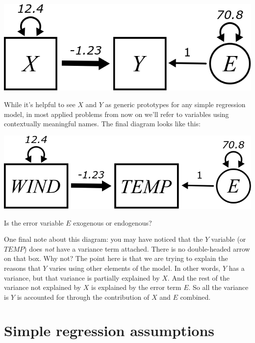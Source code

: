\documentclass[
]{book}
\begin{document}
\begin{center}\includegraphics{graphics/simple_regression_param_values} \end{center}

While it's helpful to see \(X\) and \(Y\) as generic prototypes for any simple regression model, in most applied problems from now on we'll refer to variables using contextually meaningful names. The final diagram looks like this:

\begin{center}\includegraphics{graphics/simple_regression_param_values_named_vars} \end{center}

Is the error variable \(E\) exogenous or endogenous?

One final note about this diagram: you may have noticed that the \(Y\) variable (or \(\textit{TEMP}\)) does \emph{not} have a variance term attached. There is no double-headed arrow on that box. Why not? The point here is that we are trying to explain the reasons that \(Y\) varies using other elements of the model. In other words, \(Y\) has a variance, but that variance is partially explained by \(X\). And the rest of the variance not explained by \(X\) is explained by the error term \(E\). So all the variance is \(Y\) is accounted for through the contribution of \(X\) and \(E\) combined.

\hypertarget{simple-assumptions}{%
\section{Simple regression assumptions}\label{simple-assumptions}}
\end{document}
